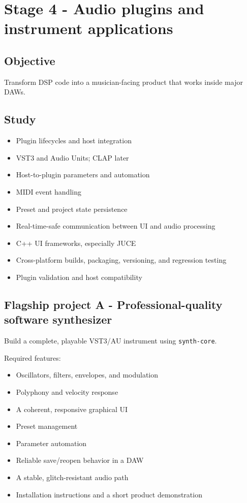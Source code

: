 \documentclass[11pt,letterpaper]{article}
\begin{document}
\clearpage

\section{Stage 4 - Audio plugins and instrument applications}\label{stage-4-audio-plugins-and-instrument-applications}

\subsection*{Objective}\label{objective-4}

Transform DSP code into a musician-facing product that works inside major DAWs.

\subsection*{Study}\label{study-1}

\begin{itemize}
\item Plugin lifecycles and host integration
\item VST3 and Audio Units; CLAP later
\item Host-to-plugin parameters and automation
\item MIDI event handling
\item Preset and project state persistence
\item Real-time-safe communication between UI and audio processing
\item C++ UI frameworks, especially JUCE
\item Cross-platform builds, packaging, versioning, and regression testing
\item Plugin validation and host compatibility
\end{itemize}

\subsection*{Flagship project A - Professional-quality software synthesizer}\label{flagship-project-a-professional-quality-software-synthesizer}

Build a complete, playable VST3/AU instrument using \texttt{synth-core}.

Required features:

\begin{itemize}
\item Oscillators, filters, envelopes, and modulation
\item Polyphony and velocity response
\item A coherent, responsive graphical UI
\item Preset management
\item Parameter automation
\item Reliable save/reopen behavior in a DAW
\item A stable, glitch-resistant audio path
\item Installation instructions and a short product demonstration
\end{itemize}
\end{document}
